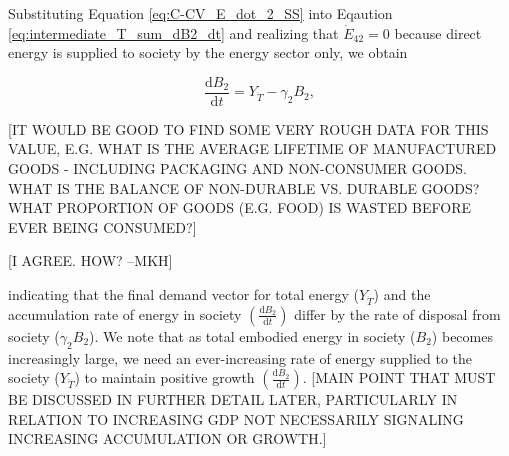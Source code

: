 Substituting Equation \ref{eq:C-CV_E_dot_2_SS} into Eqaution \ref{eq:intermediate_T_sum_dB2_dt} and realizing that $\dot{E}_{42} = 0$ because direct energy is supplied to society by the energy sector only, we obtain 

\begin{equation} \label{eq:compare_demand_and_accumulation}
	\frac{\mathrm{d}B_{2}}{\mathrm{d}t} = Y_{\dot{T}} - \gamma_{2}B_{2},
\end{equation}

[IT WOULD BE GOOD TO FIND SOME VERY ROUGH DATA FOR THIS VALUE, E.G. WHAT IS THE AVERAGE LIFETIME OF MANUFACTURED GOODS - INCLUDING PACKAGING AND NON-CONSUMER GOODS. WHAT IS THE BALANCE OF NON-DURABLE VS. DURABLE GOODS? WHAT PROPORTION OF GOODS (E.G. FOOD) IS WASTED BEFORE EVER BEING CONSUMED?]

[I AGREE. HOW? --MKH]

\noindent indicating that the final demand vector for total energy ($Y_{\dot{T}}$) and the accumulation rate of energy in society $\left(\frac{\mathrm{d}B_{2}}{\mathrm{d}t}\right)$ differ by the rate of disposal from society ($\gamma_{2}B_{2}$). We note that as total embodied energy in society ($B_{2}$) becomes increasingly large, we need an ever-increasing rate of energy supplied to the society ($Y_{\dot{T}}$) to maintain positive growth $\left(\frac{\mathrm{d}B_{2}}{\mathrm{d}t}\right)$. [MAIN POINT THAT MUST BE DISCUSSED IN FURTHER DETAIL LATER, PARTICULARLY IN RELATION TO INCREASING GDP NOT NECESSARILY SIGNALING INCREASING ACCUMULATION OR GROWTH.]

%
%
%
%
%
%
%

